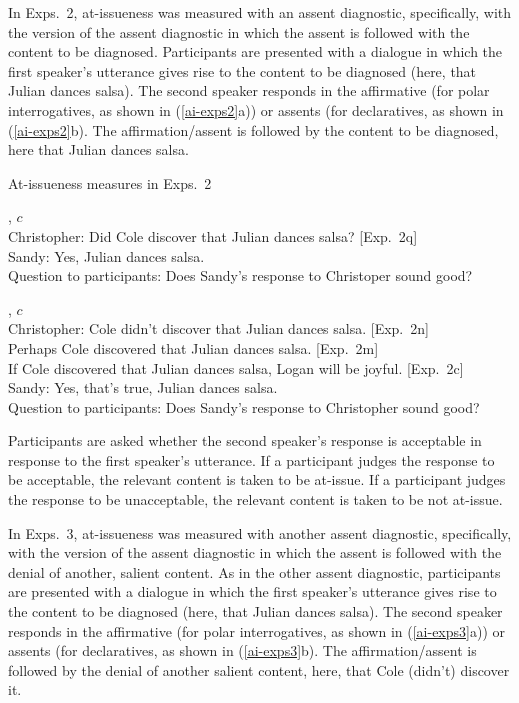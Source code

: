 \documentclass[11pt,fleqn]{article}
\newcommand{\6}{\mbox{$[\hspace*{-.6mm}[$}}
\newcommand{\9}{\mbox{$]\hspace*{-.6mm}]$}}
\begin{document}
In Exps.~2, at-issueness was measured with an assent diagnostic, specifically, with the version of the assent diagnostic in which the assent is followed with the content to be diagnosed. Participants are presented with a dialogue in which the first speaker's utterance gives rise to the content to be diagnosed (here, that Julian dances salsa). The second speaker responds in the affirmative (for polar interrogatives, as shown in (\ref{ai-exps2}a)) or assents (for declaratives, as shown in (\ref{ai-exps2}b). The affirmation/assent is followed by the content to be diagnosed, here that Julian dances salsa. 

\begin{exe}
\ex\label{ai-exps2} At-issueness measures in Exps.~2
\begin{xlist}
, $c$
\\ Christopher: Did Cole discover that Julian dances salsa? \hfill [Exp.~2q]
\\ Sandy: Yes, Julian dances salsa.
\\ Question to participants: Does Sandy's response to Christoper sound good?

, $c$
\\ Christopher: Cole didn't discover that Julian dances salsa.  \hfill [Exp.~2n]
\\ \hspace*{2cm} Perhaps Cole discovered that Julian dances salsa.  \hfill [Exp.~2m]
\\ \hspace*{2cm} If Cole discovered that Julian dances salsa, Logan will be joyful.  \hfill [Exp.~2c]
\\ Sandy: Yes, that's true, Julian dances salsa.
\\ Question to participants: Does Sandy's response to Christopher sound good?

\end{xlist}
\end{exe}
Participants are asked whether the second speaker's response is acceptable in response to the first speaker's utterance. If a participant judges the response to be acceptable, the relevant content is taken to be at-issue. If a participant judges the response to be unacceptable, the relevant content is taken to be not at-issue.

In Exps.~3, at-issueness was measured with another assent diagnostic, specifically, with the version of the assent diagnostic in which the assent is followed with the denial of another, salient content. As in the other assent diagnostic, participants are presented with a dialogue in which the first speaker's utterance gives rise to the content to be diagnosed (here, that Julian dances salsa). The second speaker responds in the affirmative (for polar interrogatives, as shown in (\ref{ai-exps3}a)) or assents (for declaratives, as shown in (\ref{ai-exps3}b). The affirmation/assent is followed by the denial of another salient content, here, that Cole (didn't) discover it.
\end{document}
